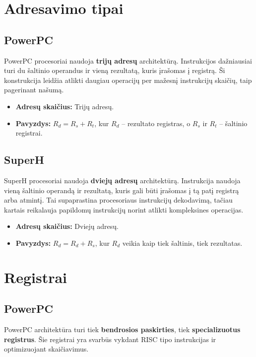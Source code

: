 \documentclass{article}
\begin{document}
\section{Adresavimo tipai}
\subsection{PowerPC}
PowerPC procesoriai naudoja \textbf{trijų adresų} architektūrą. Instrukcijos dažniausiai turi du šaltinio operandus ir vieną rezultatą, kuris įrašomas į registrą. Ši konstrukcija leidžia atlikti daugiau operacijų per mažesnį instrukcijų skaičių, taip pagerinant našumą.

\begin{itemize}
    \item \textbf{Adresų skaičius:} Trijų adresų.
    \item \textbf{Pavyzdys:} \( R_d = R_s + R_t \), kur \( R_d \) – rezultato registras, o \( R_s \) ir \( R_t \) – šaltinio registrai.
\end{itemize}

\subsection{SuperH}
SuperH procesoriai naudoja \textbf{dviejų adresų} architektūrą. Instrukcija naudoja vieną šaltinio operandą ir rezultatą, kuris gali būti įrašomas į tą patį registrą arba atmintį. Tai supaprastina procesoriaus instrukcijų dekodavimą, tačiau kartais reikalauja papildomų instrukcijų norint atlikti kompleksines operacijas.

\begin{itemize}
    \item \textbf{Adresų skaičius:} Dviejų adresų.
    \item \textbf{Pavyzdys:} \( R_d = R_d + R_s \), kur \( R_d \) veikia kaip tiek šaltinis, tiek rezultatas.
\end{itemize}

\section{Registrai}
\subsection{PowerPC}
PowerPC architektūra turi tiek \textbf{bendrosios paskirties}, tiek \textbf{specializuotus registrus}. Šie registrai yra svarbūs vykdant RISC tipo instrukcijas ir optimizuojant skaičiavimus.
\end{document}
